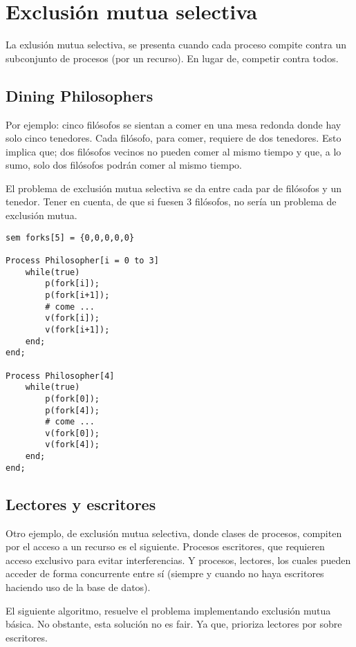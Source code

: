 \documentclass[a4paper, 10pt, margin=0in]{report}
\begin{document}
\section{Exclusión mutua selectiva}

La exlusión mutua selectiva, se presenta cuando cada proceso compite contra un subconjunto de procesos (por un recurso). En lugar de, competir contra todos.

\subsection{Dining Philosophers}

Por ejemplo: cinco filósofos se sientan a comer en una mesa redonda donde hay solo cinco tenedores. Cada filósofo, para comer, requiere de dos tenedores. Esto implica que; dos filósofos vecinos no pueden comer al mismo tiempo y que, a lo sumo, solo dos filósofos podrán comer al mismo tiempo.

El problema de exclusión mutua selectiva se da entre cada par de filósofos y un tenedor. Tener en cuenta, de que si fuesen 3 filósofos, no sería un problema de exclusión mutua.


\begin{lstlisting}[multicols=2]
sem forks[5] = {0,0,0,0,0}

Process Philosopher[i = 0 to 3]
    while(true)
        p(fork[i]);
        p(fork[i+1]);
        # come ...
        v(fork[i]); 
        v(fork[i+1]);
    end;
end;

Process Philosopher[4]
    while(true)
        p(fork[0]);
        p(fork[4]);
        # come ...
        v(fork[0]); 
        v(fork[4]);
    end;
end;
\end{lstlisting}

\subsection{Lectores y escritores}

Otro ejemplo, de exclusión mutua selectiva, donde clases de procesos, compiten por el acceso a un recurso es el siguiente. Procesos escritores, que requieren acceso exclusivo para evitar interferencias. Y procesos, lectores, los cuales pueden acceder de forma concurrente entre sí (siempre y cuando no haya escritores haciendo uso de la base de datos).

El siguiente algoritmo, resuelve el problema implementando exclusión mutua básica. No obstante, esta solución no es fair. Ya que, prioriza lectores por sobre escritores.
\end{document}
